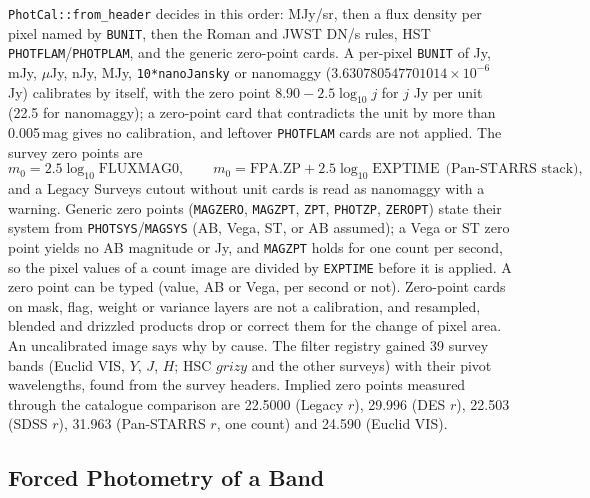 \documentclass[11pt,a4paper]{article}
\newcommand{\code}[1]{\texttt{\small #1}}
\begin{document}
    \code{PhotCal::from\_header} decides in this order: MJy/sr, then a flux density per pixel named by \code{BUNIT}, then the Roman and JWST DN/s rules, HST \code{PHOTFLAM}/\code{PHOTPLAM}, and the generic zero-point cards. A per-pixel \code{BUNIT} of Jy, mJy, $\mu$Jy, nJy, MJy, \code{10*nanoJansky} or nanomaggy ($3.630780547701014 \times 10^{-6}$\,Jy) calibrates by itself, with the zero point $8.90 - 2.5\log_{10} j$ for $j$ Jy per unit (22.5 for nanomaggy); a zero-point card that contradicts the unit by more than 0.005\,mag gives no calibration, and leftover \code{PHOTFLAM} cards are not applied. The survey zero points are
    \begin{equation}
        m_0 = 2.5 \log_{10} \text{FLUXMAG0}, \qquad m_0 = \text{FPA.ZP} + 2.5 \log_{10} \text{EXPTIME}\ \ \text{(Pan-STARRS stack)},
    \end{equation}
    and a Legacy Surveys cutout without unit cards is read as nanomaggy with a warning. Generic zero points (\code{MAGZERO}, \code{MAGZPT}, \code{ZPT}, \code{PHOTZP}, \code{ZEROPT}) state their system from \code{PHOTSYS}/\code{MAGSYS} (AB, Vega, ST, or AB assumed); a Vega or ST zero point yields no AB magnitude or Jy, and \code{MAGZPT} holds for one count per second, so the pixel values of a count image are divided by \code{EXPTIME} before it is applied. A zero point can be typed (value, AB or Vega, per second or not). Zero-point cards on mask, flag, weight or variance layers are not a calibration, and resampled, blended and drizzled products drop or correct them for the change of pixel area. An uncalibrated image says why by cause. The filter registry gained 39 survey bands (Euclid VIS, $Y$, $J$, $H$; HSC $grizy$ and the other surveys) with their pivot wavelengths, found from the survey headers. Implied zero points measured through the catalogue comparison are 22.5000 (Legacy $r$), 29.996 (DES $r$), 22.503 (SDSS $r$), 31.963 (Pan-STARRS $r$, one count) and 24.590 (Euclid VIS).

    \subsection{Forced Photometry of a Band}
    \label{sec:forced}
\end{document}
